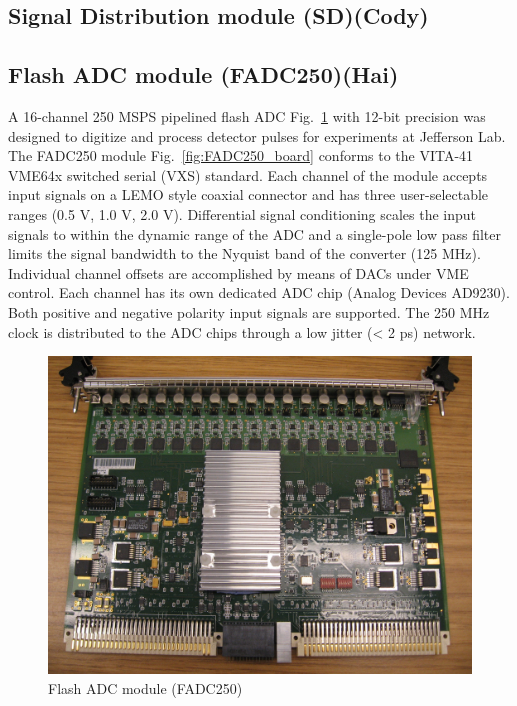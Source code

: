 
	
\subsection{Signal Distribution module (SD)(Cody)}

\subsection{Flash ADC module (FADC250)(Hai)}

A 16-channel 250 MSPS pipelined flash ADC Fig.~\ref{fig:FADC250pic} with 12-bit precision was designed to digitize and process detector pulses for experiments at Jefferson Lab.  The FADC250 module Fig.~\ref{fig:FADC250_board} conforms to the VITA-41 VME64x switched serial (VXS) standard.  Each channel of the module accepts input signals on a LEMO style coaxial connector and has three user-selectable ranges (0.5 V, 1.0 V, 2.0 V).  Differential signal conditioning scales the input signals to within the dynamic range of the ADC and a single-pole low pass filter limits the signal bandwidth to the Nyquist band of the converter (125 MHz). Individual channel offsets are accomplished by means of DACs under VME control.  Each channel has its own dedicated ADC chip (Analog Devices AD9230). Both positive and negative polarity input signals are supported. The 250 MHz clock is distributed to the ADC chips through a low jitter (< 2 ps) network.  

\begin{figure}[hbt]
	\centering
	\includegraphics[width=1.0\columnwidth,keepaspectratio]{img/FADC250pic.jpg}
	\caption{Flash ADC module (FADC250)}
	\label{fig:FADC250pic}
\end{figure}

